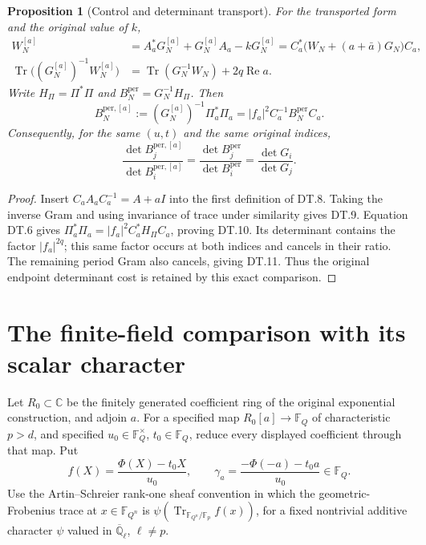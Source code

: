 \documentclass[11pt,a4paper]{article}
\newtheorem{proposition}{Proposition}
\newcommand{\Tr}{\operatorname{Tr}}
\begin{document}
\begin{proposition}[Control and determinant transport]
For the transported form and the original value of \(k\),
\begin{align}
 W_N^{[a]}&=A_a^*G_N^{[a]}+G_N^{[a]}A_a-kG_N^{[a]}
       =C_a^*\bigl(W_N+(a+\bar a)G_N\bigr)C_a,\tag{DT.8}\\
 \Tr\bigl((G_N^{[a]})^{-1}W_N^{[a]}\bigr)
       &=\Tr(G_N^{-1}W_N)+2q\operatorname{Re}a.\tag{DT.9}
\end{align}
Write \(H_\Pi=\Pi^*\Pi\) and
\(B_N^{\mathrm{per}}=G_N^{-1}H_\Pi\). Then
\begin{equation}\tag{DT.10}
 B_N^{\mathrm{per},[a]}
  :=(G_N^{[a]})^{-1}\Pi_a^*\Pi_a
   =|f_a|^2 C_a^{-1}B_N^{\mathrm{per}}C_a.
\end{equation}
Consequently, for the same \((u,t)\) and the same original indices,
\begin{equation}\tag{DT.11}
 \frac{\det B_j^{\mathrm{per},[a]}}{\det B_i^{\mathrm{per},[a]}}
   =\frac{\det B_j^{\mathrm{per}}}{\det B_i^{\mathrm{per}}}
   =\frac{\det G_i}{\det G_j}.
\end{equation}
\end{proposition}
\begin{proof}
Insert \(C_aA_aC_a^{-1}=A+aI\) into the first definition of DT.8.
Taking the inverse Gram and using invariance of trace under similarity
gives DT.9. Equation DT.6 gives
\(\Pi_a^*\Pi_a=|f_a|^2C_a^*H_\Pi C_a\), proving DT.10.
Its determinant contains the factor \(|f_a|^{2q}\); this same factor
occurs at both indices and cancels in their ratio. The remaining period
Gram also cancels, giving DT.11. Thus the original endpoint determinant
cost is retained by this exact comparison.
\end{proof}

\section{The finite-field comparison with its scalar character}
Let \(R_0\subset\mathbb C\) be the finitely generated coefficient ring
of the original exponential construction, and adjoin \(a\). For a
specified map \(R_0[a]\to\mathbb F_Q\) of characteristic \(p>d\),
and specified \(u_0\in\mathbb F_Q^\times\), \(t_0\in\mathbb F_Q\),
reduce every displayed coefficient through that map. Put
\[
 f(X)=\frac{\Phi(X)-t_0X}{u_0},\qquad
 \gamma_a=\frac{-\Phi(-a)-t_0a}{u_0}\in\mathbb F_Q.
\]
Use the Artin--Schreier rank-one sheaf convention in which the
geometric-Frobenius trace at \(x\in\mathbb F_{Q^n}\) is
\(\psi(\Tr_{\mathbb F_{Q^n}/\mathbb F_p}f(x))\), for a fixed
nontrivial additive character \(\psi\) valued in
\(\overline{\mathbb Q}_\ell\), \(\ell\ne p\).
\end{document}
